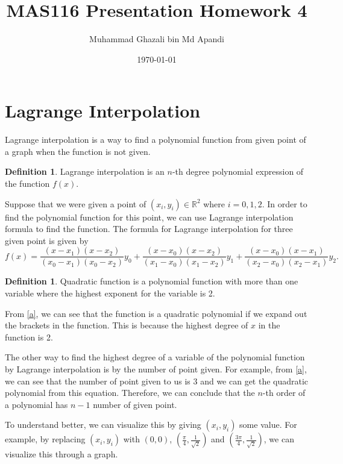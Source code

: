 \documentclass[11pt, a4paper]{amsart}
\title{MAS116 Presentation Homework 4}
\author{Muhammad Ghazali bin Md Apandi}
\date{\today}
\theoremstyle{plain}
\theoremstyle{definition}
\newtheorem{defn}[thm]{Definition}
\theoremstyle{remark}
\begin{document}
\maketitle

\section{Lagrange Interpolation}

	Lagrange interpolation is a way to find a polynomial function from given point of a graph when the function is not given.  
	
\begin{defn}
	Lagrange interpolation is an $n$-th degree polynomial expression of the function $f(x)$. 	
\end{defn}

Suppose that we were given a point of $(x_i,y_i) \in \mathbb{R}^2$ where $i = 0,1,2$. In order to find the polynomial function for this point, we can use Lagrange interpolation formula to find the function. The formula for Lagrange interpolation for three given point is given by 
\begin{equation}
\label{a}
	f(x)=\frac{(x-x_1)(x-x_2)}{(x_0-x_1)(x_0-x_2)}y_0 + \frac{(x-x_0)(x-x_2)}{(x_1-x_0)(x_1-x_2)}y_1 + \frac{(x-x_0)(x-x_1)}{(x_2-x_0)(x_2-x_1)}y_2.
\end{equation}

\begin{defn}
Quadratic function is a polynomial function with more than one variable where the highest exponent for the variable is 2.
\end{defn}

From \ref{a}, we can see that the function is a quadratic polynomial if we expand out the brackets in the function. This is because the highest degree of $x$ in the function is 2.

The other way to find the highest degree of a variable of the polynomial function by Lagrange interpolation is by the number of point given. For example, from \ref{a}, we can see that the number of point given to us is 3 and we can get the quadratic polynomial from this equation. Therefore, we can conclude that the $n$-th order of a polynomial has $n-1$ number of given point.

To understand better, we can visualize this by giving $(x_i,y_i)$ some value. For example, by replacing $(x_i,y_i)$ with $(0,0)$, $(\frac{\pi}{4},\frac{1}{\sqrt{2}})$ and $(\frac{3\pi}{4},\frac{1}{\sqrt{2}})$, we can visualize this through a graph.
\end{document}
